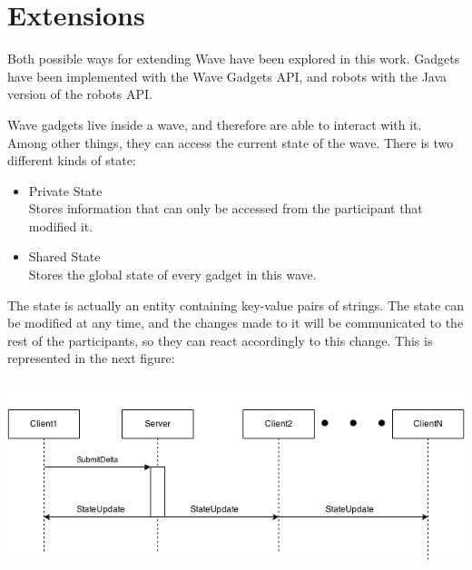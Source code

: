 \newpage
\section{Extensions}

Both possible ways for extending Wave have been explored in this work. Gadgets have been implemented with the Wave Gadgets API, and robots with the Java version of the robots API.

Wave gadgets live inside a wave, and therefore are able to interact with it. Among other things, they can access the current state of the wave. There is two different kinds of state:

\begin{itemize}
  \item Private State\\
        Stores information that can only be accessed from the participant that modified it.
  \item Shared State\\
        Stores the global state of every gadget in this wave.
\end{itemize}

The state is actually an entity containing key-value pairs of strings. The state can be modified at any time, and the changes made to it will be communicated to the rest of the participants, so they can react accordingly to this change. This is represented in the next figure:

\begin{center}
\includegraphics[keepaspectratio, scale=0.6]{Media/Diagrams/State/StateSequence.png}
\end{center}





